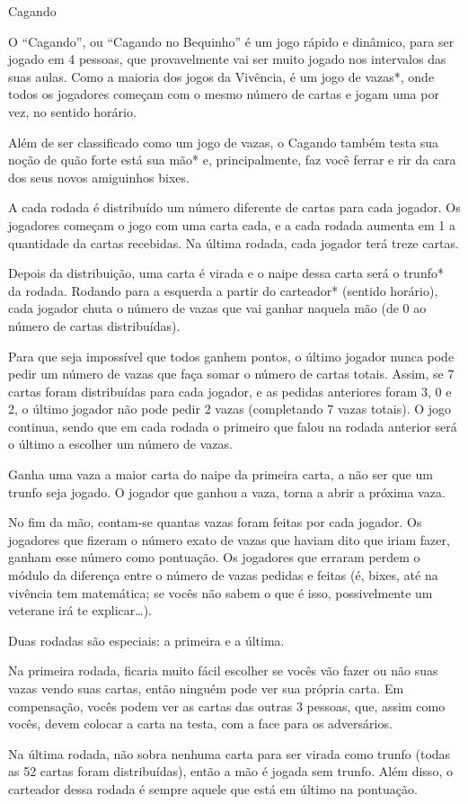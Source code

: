 \begin{subsecao}{Cagando}

O ``Cagando'', ou ``Cagando no Bequinho'' é um jogo rápido e dinâmico, para ser
jogado em 4 pessoas, que provavelmente vai ser muito jogado nos intervalos das
suas aulas. Como a maioria dos jogos da Vivência, é um jogo de vazas*, onde todos
os jogadores começam com o mesmo número de cartas e jogam uma por vez, no sentido
horário.

Além de ser classificado como um jogo de vazas, o Cagando também testa sua noção
de quão forte está sua mão* e, principalmente, faz você ferrar e rir da
cara dos seus novos amiguinhos bixes.

A cada rodada é distribuído um número diferente de cartas para cada jogador. Os
jogadores começam o jogo com uma carta cada, e a cada rodada aumenta em 1 a
quantidade da cartas recebidas. Na última rodada, cada jogador terá treze cartas.

Depois da distribuição, uma carta é virada e o naipe dessa carta será o trunfo*
da rodada. Rodando para a esquerda a partir do carteador* (sentido horário), cada
jogador chuta o número de vazas que vai ganhar naquela mão (de 0 ao número de
cartas distribuídas).

Para que seja impossível que todos ganhem pontos, o último jogador nunca pode
pedir um número de vazas que faça somar o número de cartas totais. Assim, se 7
cartas foram distribuídas para cada jogador, e as pedidas anteriores foram 3, 0
e 2, o último jogador não pode pedir 2 vazas (completando 7 vazas totais). O
jogo continua, sendo que em cada rodada o primeiro que falou na rodada anterior
será o último a escolher um número de vazas.

Ganha uma vaza a maior carta do naipe da primeira carta, a não ser que um
trunfo seja jogado. O jogador que ganhou a vaza, torna a abrir a próxima vaza. 

No fim da mão, contam-se quantas vazas foram feitas por cada
jogador. Os jogadores que fizeram o número exato de vazas que haviam
dito que iriam fazer, ganham esse número como pontuação. Os jogadores
que erraram perdem o módulo da diferença entre o número de vazas pedidas e feitas
(é, bixes, até na vivência tem matemática; se vocês não sabem o que é isso,
possivelmente um veterane irá te explicar\dots).

Duas rodadas são especiais: a primeira e a última. 

Na primeira rodada, ficaria muito fácil escolher se vocês vão fazer ou não suas
vazas vendo suas cartas, então ninguém pode ver sua própria carta. Em
compensação, vocês podem ver as cartas das outras 3 pessoas, que, assim como
vocês, devem colocar a carta na testa, com a face para os adversários.

Na última rodada, não sobra nenhuma carta para ser virada como trunfo (todas
as 52 cartas foram distribuídas), então a mão é jogada sem trunfo. Além disso,
o carteador dessa rodada é sempre aquele que está em último na pontuação.

\end{subsecao}
